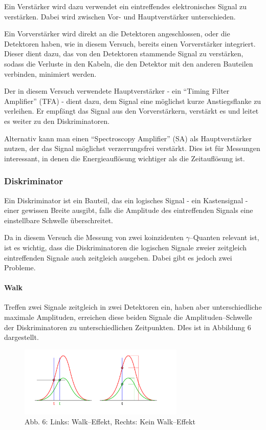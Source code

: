 \documentclass[12pt,a4paper]{scrartcl}
\numberwithin{equation}{section} %
\renewcommand{\[}{} %
\renewcommand{\]}{\noindent} %
\begin{document}
Ein Verstärker wird dazu verwendet ein eintreffendes elektronisches
Signal zu verstärken. Dabei wird zwischen Vor- und Hauptverstärker
unterschieden.

Ein Vorverstärker wird direkt an die Detektoren angeschlossen, oder die
Detektoren haben, wie in diesem Versuch, bereits einen Vorverstärker
integriert. Dieser dient dazu, das von den Detektoren stammende Signal
zu verstärken, sodass die Verluste in den Kabeln, die den Detektor mit
den anderen Bauteilen verbinden, minimiert werden.

Der in diesem Versuch verwendete Hauptverstärker - ein ``Timing Filter
Amplifier'' (TFA) - dient dazu, dem Signal eine möglichst kurze
Anstiegsflanke zu verleihen. Er empfängt das Signal aus den
Vorverstärkern, verstärkt es und leitet es weiter zu den
Diskriminatoren.

Alternativ kann man einen ``Spectroscopy Amplifier'' (SA) als Hauptverstärker nutzen, der das Signal möglichst verzerrungsfrei verstärkt. Dies ist für Messungen interessant, in denen die Energieauflösung wichtiger als die Zeitauflösung ist.

\hypertarget{diskriminator}{%
\subsubsection{Diskriminator}\label{diskriminator}}

Ein Diskriminator ist ein Bauteil, das ein logisches Signal - ein
Kastensignal - einer gewissen Breite ausgibt, falls die Amplitude des
eintreffenden Signals eine einstellbare Schwelle überschreitet.

Da in diesem Versuch die Messung von zwei koinzidenten
\(\gamma\)--Quanten relevant ist, ist es wichtig, dass die
Diskriminatoren die logischen Signale zweier zeitgleich eintreffenden
Signale auch zeitgleich ausgeben. Dabei gibt es jedoch zwei Probleme.

\hypertarget{walk}{%
\paragraph{Walk}\label{walk}}

Treffen zwei Signale zeitgleich in zwei Detektoren ein, haben aber
unterschiedliche maximale Amplituden, erreichen diese beiden Signale die
Amplituden--Schwelle der Diskriminatoren zu unterschiedlichen
Zeitpunkten. DIes ist in Abbildung \(6\) dargestellt.

\begin{figure}
	\centering
	\includegraphics[width=0.7\textwidth]{../media/B3.4/Constant_fraction_1.pdf}
	\caption{Abb. 6: Links: Walk--Effekt, Rechts: Kein Walk--Effekt}
	\label{abb:Walk-Effekt}
\end{figure}
\end{document}
